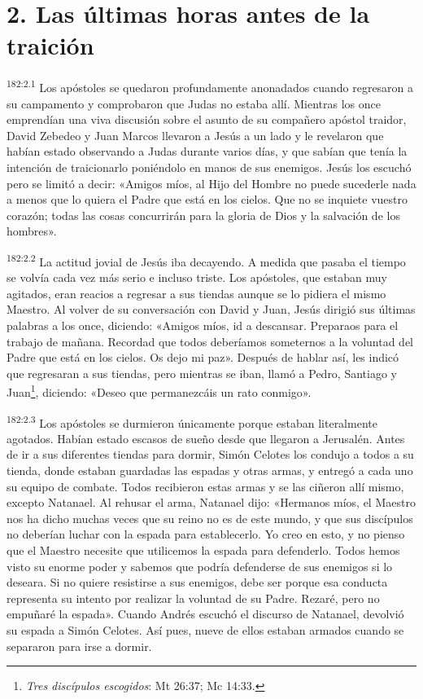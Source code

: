 \section*{2. Las últimas horas antes de la traición}
\par
\textsuperscript{182:2.1} Los apóstoles se quedaron profundamente anonadados cuando regresaron a su campamento y comprobaron que Judas no estaba allí. Mientras los once emprendían una viva discusión sobre el asunto de su compañero apóstol traidor, David Zebedeo y Juan Marcos llevaron a Jesús a un lado y le revelaron que habían estado observando a Judas durante varios días, y que sabían que tenía la intención de traicionarlo poniéndolo en manos de sus enemigos. Jesús los escuchó pero se limitó a decir: «Amigos míos, al Hijo del Hombre no puede sucederle nada a menos que lo quiera el Padre que está en los cielos. Que no se inquiete vuestro corazón; todas las cosas concurrirán para la gloria de Dios y la salvación de los hombres».

\par
\textsuperscript{182:2.2} La actitud jovial de Jesús iba decayendo. A medida que pasaba el tiempo se volvía cada vez más serio e incluso triste. Los apóstoles, que estaban muy agitados, eran reacios a regresar a sus tiendas aunque se lo pidiera el mismo Maestro. Al volver de su conversación con David y Juan, Jesús dirigió sus últimas palabras a los once, diciendo: «Amigos míos, id a descansar. Preparaos para el trabajo de mañana. Recordad que todos deberíamos someternos a la voluntad del Padre que está en los cielos. Os dejo mi paz». Después de hablar así, les indicó que regresaran a sus tiendas, pero mientras se iban, llamó a Pedro, Santiago y Juan\footnote{\textit{Tres discípulos escogidos}: Mt 26:37; Mc 14:33.}, diciendo: «Deseo que permanezcáis un rato conmigo».

\par
\textsuperscript{182:2.3} Los apóstoles se durmieron únicamente porque estaban literalmente agotados. Habían estado escasos de sueño desde que llegaron a Jerusalén. Antes de ir a sus diferentes tiendas para dormir, Simón Celotes los condujo a todos a su tienda, donde estaban guardadas las espadas y otras armas, y entregó a cada uno su equipo de combate. Todos recibieron estas armas y se las ciñeron allí mismo, excepto Natanael. Al rehusar el arma, Natanael dijo: «Hermanos míos, el Maestro nos ha dicho muchas veces que su reino no es de este mundo, y que sus discípulos no deberían luchar con la espada para establecerlo. Yo creo en esto, y no pienso que el Maestro necesite que utilicemos la espada para defenderlo. Todos hemos visto su enorme poder y sabemos que podría defenderse de sus enemigos si lo deseara. Si no quiere resistirse a sus enemigos, debe ser porque esa conducta representa su intento por realizar la voluntad de su Padre. Rezaré, pero no empuñaré la espada». Cuando Andrés escuchó el discurso de Natanael, devolvió su espada a Simón Celotes. Así pues, nueve de ellos estaban armados cuando se separaron para irse a dormir.

